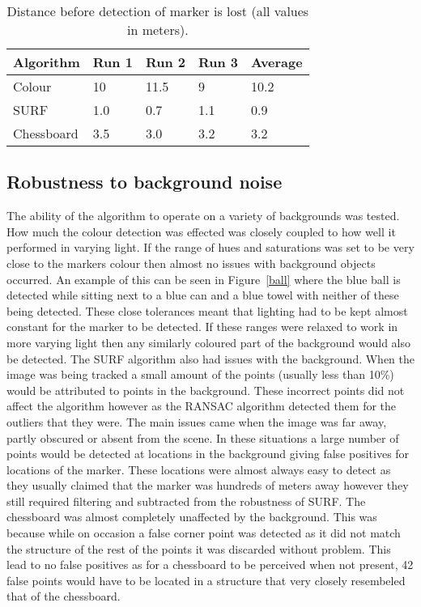 \begin{table}
	\caption{Distance before detection of marker is lost (all values in meters).}
	\begin{center}
    	\begin{tabular}{ | l | l | l | l | l |}
    	\hline
    	Algorithm & Run 1 & Run 2 & Run 3 & Average \\ \hline
		Colour & 10 & 11.5 & 9 & 10.2 \\ \hline
		SURF & 1.0 & 0.7 & 1.1 & 0.9 \\ \hline
		Chessboard & 3.5 & 3.0 & 3.2 & 3.2 \\ \hline
    	\end{tabular}
	\end{center}
	\label{dist}
	
\end{table}

\subsection{Robustness to background noise}
The ability of the algorithm to operate on a variety of backgrounds was tested. How much the colour detection was effected was closely coupled to how well it performed in varying light. If the range of hues and saturations was set to be very close to the markers colour then almost no issues with background objects occurred. An example of this can be seen in Figure~\ref{ball} where the blue ball is detected while sitting next to a blue can and a blue towel with neither of these being detected. These close tolerances meant that lighting had to be kept almost constant for the marker to be detected. If these ranges were relaxed to work in more varying light then any similarly coloured part of the background would also be detected. The SURF algorithm also had issues with the background. When the image was being tracked a small amount of the points (usually less than 10\%) would be attributed to points in the background. These incorrect points did not affect the algorithm however as the RANSAC algorithm detected them for the outliers that they were. The main issues came when the image was far away, partly obscured or absent from the scene. In these situations a large number of points would be detected at locations in the background giving false positives for locations of the marker. These locations were almost always easy to detect as they usually claimed that the marker was hundreds of meters away however they still required filtering and subtracted from the robustness of SURF. The chessboard was almost completely unaffected by the background. This was because while on occasion a false corner point was detected as it did not match the structure of the rest of the points it was discarded without problem. This lead to no false positives as for a chessboard to be perceived when not present, 42 false points would have to be located in a structure that very closely resembeled that of the chessboard.


